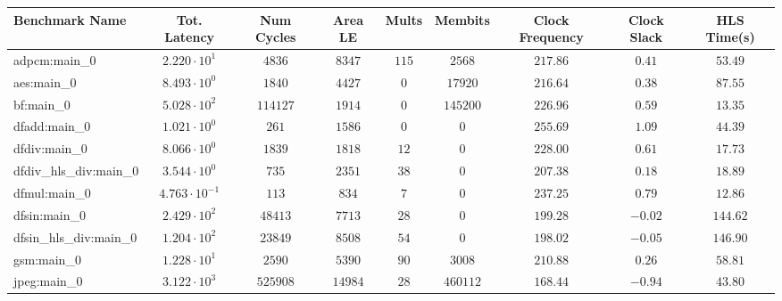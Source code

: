 \begin{tabular}{|l|c|c|c|c|c|c|c|c|}
\hline
Benchmark Name          & Tot. Latency            & Num Cycles & Area LE   & Mults   & Membits    & Clock Frequency & Clock Slack & HLS Time(s) \\
\hline
adpcm:main\_0           & $ 2.220 \cdot 10^{1}  $ & $ 4836   $ & $ 8347  $ & $ 115 $ & $ 2568   $ & $ 217.86      $ & $ 0.41    $ & $ 53.49   $ \\
aes:main\_0             & $ 8.493 \cdot 10^{0}  $ & $ 1840   $ & $ 4427  $ & $ 0   $ & $ 17920  $ & $ 216.64      $ & $ 0.38    $ & $ 87.55   $ \\
bf:main\_0              & $ 5.028 \cdot 10^{2}  $ & $ 114127 $ & $ 1914  $ & $ 0   $ & $ 145200 $ & $ 226.96      $ & $ 0.59    $ & $ 13.35   $ \\
dfadd:main\_0           & $ 1.021 \cdot 10^{0}  $ & $ 261    $ & $ 1586  $ & $ 0   $ & $ 0      $ & $ 255.69      $ & $ 1.09    $ & $ 44.39   $ \\
dfdiv:main\_0           & $ 8.066 \cdot 10^{0}  $ & $ 1839   $ & $ 1818  $ & $ 12  $ & $ 0      $ & $ 228.00      $ & $ 0.61    $ & $ 17.73   $ \\
dfdiv\_hls\_div:main\_0 & $ 3.544 \cdot 10^{0}  $ & $ 735    $ & $ 2351  $ & $ 38  $ & $ 0      $ & $ 207.38      $ & $ 0.18    $ & $ 18.89   $ \\
dfmul:main\_0           & $ 4.763 \cdot 10^{-1} $ & $ 113    $ & $ 834   $ & $ 7   $ & $ 0      $ & $ 237.25      $ & $ 0.79    $ & $ 12.86   $ \\
dfsin:main\_0           & $ 2.429 \cdot 10^{2}  $ & $ 48413  $ & $ 7713  $ & $ 28  $ & $ 0      $ & $ 199.28      $ & $ -0.02   $ & $ 144.62  $ \\
dfsin\_hls\_div:main\_0 & $ 1.204 \cdot 10^{2}  $ & $ 23849  $ & $ 8508  $ & $ 54  $ & $ 0      $ & $ 198.02      $ & $ -0.05   $ & $ 146.90  $ \\
gsm:main\_0             & $ 1.228 \cdot 10^{1}  $ & $ 2590   $ & $ 5390  $ & $ 90  $ & $ 3008   $ & $ 210.88      $ & $ 0.26    $ & $ 58.81   $ \\
jpeg:main\_0            & $ 3.122 \cdot 10^{3}  $ & $ 525908 $ & $ 14984 $ & $ 28  $ & $ 460112 $ & $ 168.44      $ & $ -0.94   $ & $ 43.80   $ \\

\end{tabular}
